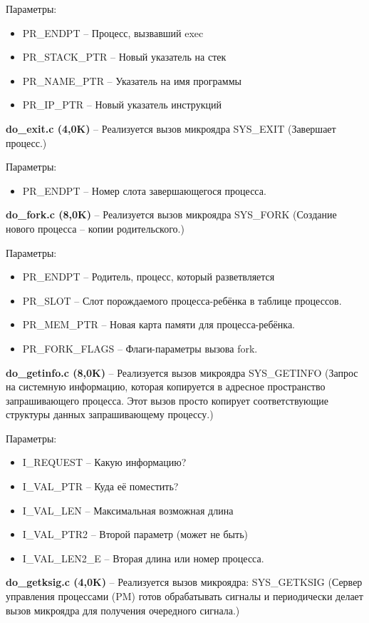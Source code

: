 Параметры:
\begin{itemize}
\item PR\_ENDPT -- Процесс, вызвавший exec
\item PR\_STACK\_PTR -- Новый указатель на стек
\item PR\_NAME\_PTR -- Указатель на имя программы
\item PR\_IP\_PTR -- Новый указатель инструкций
\end{itemize}

\textbf{do\_exit.c (4,0K)} -- Реализуется вызов микроядра SYS\_EXIT (Завершает процесс.)

Параметры:
\begin{itemize}
\item PR\_ENDPT -- Номер слота завершающегося процесса.
\end{itemize}

\textbf{do\_fork.c (8,0K)} -- Реализуется вызов микроядра SYS\_FORK (Создание нового процесса -- копии родительского.)

Параметры:
\begin{itemize}
\item PR\_ENDPT -- Родитель, процесс, который разветвляется
\item PR\_SLOT -- Слот порождаемого процесса-ребёнка в таблице процессов.
\item PR\_MEM\_PTR -- Новая карта памяти для процесса-ребёнка.
\item PR\_FORK\_FLAGS -- Флаги-параметры вызова fork.
\end{itemize}

\textbf{do\_getinfo.c (8,0K)} -- Реализуется вызов микроядра SYS\_GETINFO (Запрос на системную информацию, которая копируется в адресное пространство запрашивающего процесса. Этот вызов просто копирует соответствующие структуры данных запрашивающему процессу.)

Параметры:
\begin{itemize}
\item I\_REQUEST -- Какую информацию?
\item I\_VAL\_PTR -- Куда её поместить?
\item I\_VAL\_LEN -- Максимальная возможная длина
\item I\_VAL\_PTR2 -- Второй параметр (может не быть)
\item I\_VAL\_LEN2\_E -- Вторая длина или номер процесса.
\end{itemize}

\textbf{do\_getksig.c (4,0K)} -- Реализуется вызов микроядра: SYS\_GETKSIG (Сервер управления процессами (PM) готов обрабатывать сигналы и периодически делает вызов микроядра для получения очередного сигнала.)

